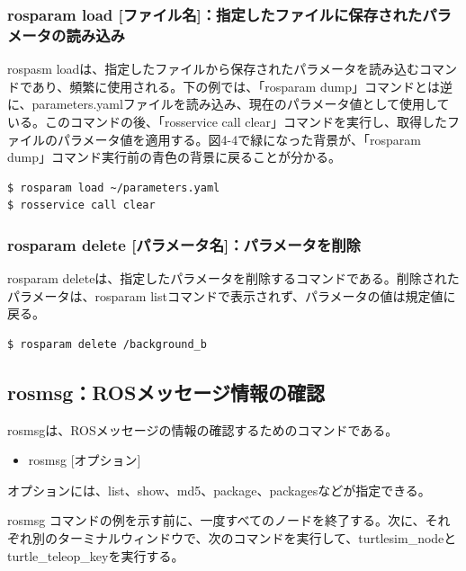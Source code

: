 \subsubsection{rosparam load [ファイル名]：指定したファイルに保存されたパラメータの読み込み}

rospasm loadは、指定したファイルから保存されたパラメータを読み込むコマンドであり、頻繁に使用される。下の例では、「rosparam dump」コマンドとは逆に、parameters.yamlファイルを読み込み、現在のパラメータ値として使用している。このコマンドの後、「rosservice call clear」コマンドを実行し、取得したファイルのパラメータ値を適用する。図4-4で緑になった背景が、「rosparam dump」コマンド実行前の青色の背景に戻ることが分かる。

\begin{lstlisting}[language=ROS]
$ rosparam load ~/parameters.yaml
$ rosservice call clear
\end{lstlisting}

\subsubsection{rosparam delete [パラメータ名]：パラメータを削除}

rosparam deleteは、指定したパラメータを削除するコマンドである。削除されたパラメータは、rosparam listコマンドで表示されず、パラメータの値は規定値に戻る。

\begin{lstlisting}[language=ROS]
$ rosparam delete /background_b
\end{lstlisting}

\subsection{rosmsg：ROSメッセージ情報の確認}

rosmsgは、ROSメッセージの情報の確認するためのコマンドである。

\begin{itemize}
\item   rosmsg [オプション]
\end{itemize}

オプションには、list、show、md5、package、packagesなどが指定できる。

rosmsg コマンドの例を示す前に、一度すべてのノードを終了する。次に、それぞれ別のターミナルウィンドウで、次のコマンドを実行して、turtlesim\_nodeとturtle\_teleop\_keyを実行する。

